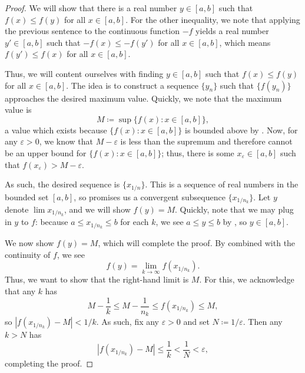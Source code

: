 \documentclass[../notes.tex]{subfiles}
\begin{document}
\begin{proof}
    We will show that there is a real number $y\in[a,b]$ such that $f(x)\le f(y)$ for all $x\in[a,b]$. For the other inequality, we note that applying the previous sentence to the continuous function $-f$ yields a real number $y'\in[a,b]$ such that $-f(x)\le-f(y')$ for all $x\in[a,b]$, which means $f(y')\le f(x)$ for all $x\in[a,b]$.

    Thus, we will content ourselves with finding $y\in[a,b]$ such that $f(x)\le f(y)$ for all $x\in[a,b]$. The idea is to construct a sequence $\{y_n\}$ such that $\{f(y_n)\}$ approaches the desired maximum value. Quickly, we note that the maximum value is
    \[M\coloneqq\sup\{f(x):x\in[a,b]\},\]
    a value which exists because $\{f(x):x\in[a,b]\}$ is bounded above by . Now, for any $\varepsilon>0$, we know that $M-\varepsilon$ is less than the supremum and therefore cannot be an upper bound for $\{f(x):x\in[a,b]\}$; thus, there is some $x_\varepsilon\in[a,b]$ such that $f(x_\varepsilon)>M-\varepsilon$.

    As such, the desired sequence is $\{x_{1/n}\}$. This is a sequence of real numbers in the bounded set $[a,b]$, so  promises us a convergent subsequence $\{x_{1/n_k}\}$. Let $y$ denote $\lim x_{1/n_k}$, and we will show $f(y)=M$. Quickly, note that we may plug in $y$ to $f$: because $a\le x_{1/n_k}\le b$ for each $k$, we see $a\le y\le b$ by , so $y\in[a,b]$.

    We now show $f(y)=M$, which will complete the proof. By  combined with the continuity of $f$, we see
    \[f(y)=\lim_{k\to\infty}f(x_{1/n_k}).\]
    Thus, we want to show that the right-hand limit is $M$. For this, we acknowledge that any $k$ has
    \[M-\frac1k\le M-\frac1{n_k}\le f(x_{1/n_k})\le M,\]
    so $\left|f(x_{1/n_k})-M\right|<1/k$. As such, fix any $\varepsilon>0$ and set $N\coloneqq1/\varepsilon$. Then any $k>N$ has
    \[\left|f(x_{1/n_k})-M\right|\le\frac1k<\frac1N<\varepsilon,\]
    completing the proof.
\end{proof}
\end{document}
